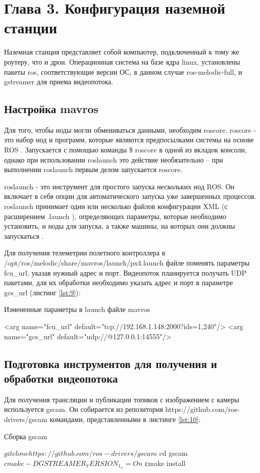 
\section{Глава 3. Конфигурация наземной станции}
Наземная станция представляет собой компьютер, подключенный к тому же роутеру, что и дрон. Операционная система на базе ядра linux, установлены пакеты ros, соответствующие версии ОС, в данном случае ros-melodic-full, и gstreamer для приема видеопотока.

\subsection{Настройка mavros}
Для того, чтобы ноды могли обмениваться данными, необходим roscore. roscore - это набор нод и программ, которые являются предпосылками системы на основе ROS \cite{ros}. Запускается с помощью команды \$ roscore в одной из вкладок консоли, однако при использовании roslaunch это действие необязательно -- при выполнении roslaunch первым делом запускается roscore.

roslaunch - это инструмент для простого запуска нескольких нод ROS. Он включает в себя опции для автоматического запуска уже завершенных процессов. roslaunch принимает один или несколько файлов конфигурации XML (с расширением .launch ), определяющих параметры, которые необходимо установить, и ноды для запуска, а также машины, на которых они должны запускаться \cite{ros}.

Для получения телеметрии полетного контроллера в /opt/ros/melodic/sha\-re/mavros/launch/px4.launch файле поменять параметры fcu\_url, указав нужный адрес и порт. Видеопоток планируется получать UDP пакетами, для их обработки необходимо указать адрес и порт в параметре gcs\_url (листинг \ref{lst:9}):
\begin{Program}[H]
	\caption{Измененные параметры в launch файле mavros} \label{lst:9}
\begin{MyCode}
<arg name="fcu_url" default="tcp://192.168.1.148:2000?ids=1,240"/>   
<arg name="gcs_url" default="udp://@127.0.0.1:14555"/>
\end{MyCode}
\end{Program}

\subsection{Подготовка инструментов для получения и обработки видеопотока}
Для получения трансляции и публикации топиков с изображением с камеры используется gscam. Он собирается из репозитория https://github.com/ros-drivers/gscam командами, представленными в листинге \ref{lst:10}:
\begin{Program}[H]
	\caption{Сборка gscam} \label{lst:10}
\begin{MyCode}
$ git clone https://github.com/ros-drivers/gscam
$ cd gscam
$ cmake -DGSTREAMER_VERSION_1_x=On
$ сmake install
\end{MyCode}
\end{Program}

